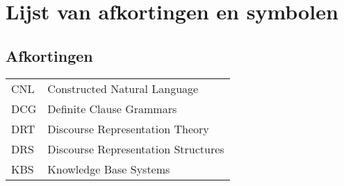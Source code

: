 \chapter{Lijst van afkortingen en symbolen}
\section*{Afkortingen}
\begin{flushleft}
  \renewcommand{\arraystretch}{1.1}
  \begin{tabularx}{\textwidth}{@{}p{12mm}X@{}}
    CNL   & Constructed Natural Language \\
    DCG   & Definite Clause Grammars \\
    DRT   & Discourse Representation Theory \\
    DRS   & Discourse Representation Structures \\
    KBS   & Knowledge Base Systems \\
  \end{tabularx}
\end{flushleft}
